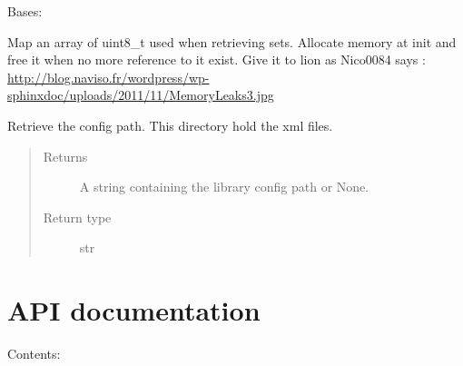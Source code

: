 \documentclass[letterpaper,10pt,english]{sphinxmanual}
\begin{document}

\begin{fulllineitems}
\label{libopenzwave:libopenzwave.RetAlloc}
Bases: 

Map an array of uint8\_t used when retrieving sets.
Allocate memory at init and free it when no more reference to it exist.
Give it to lion as Nico0084 says : \href{http://blog.naviso.fr/wordpress/wp-sphinxdoc/uploads/2011/11/MemoryLeaks3.jpg}{http://blog.naviso.fr/wordpress/wp-sphinxdoc/uploads/2011/11/MemoryLeaks3.jpg}

\end{fulllineitems}


\begin{fulllineitems}
\label{libopenzwave:libopenzwave.configPath}
Retrieve the config path. This directory hold the xml files.
\begin{quote}\begin{description}
\item[{Returns}] \leavevmode
A string containing the library config path or None.

\item[{Return type}] \leavevmode
str

\end{description}\end{quote}

\end{fulllineitems}


\begin{fulllineitems}
\label{libopenzwave:libopenzwave.driverData}
\end{fulllineitems}



\chapter{API documentation}
\label{openzwave:api-documentation}\label{openzwave::doc}
Contents:
\end{document}
